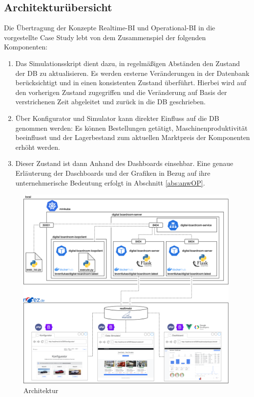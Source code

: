 \subsection{Architekturübersicht}
Die Übertragung der Konzepte Realtime-\ac{BI} und Operational-\ac{BI} in die vorgestellte Case Study lebt von dem Zusammenspiel der folgenden Komponenten: 
\begin{enumerate}
    \item Das Simulationsskript dient dazu, in regelmäßigen Abständen den Zustand der \ac{DB} zu aktualisieren. Es werden ersterne Veränderungen in der Datenbank berücksichtigt und in einen konsistenten Zustand überführt. Hierbei wird auf den vorherigen Zustand zugegriffen und die Veränderung auf Basis der verstrichenen Zeit abgeleitet und zurück in die \ac{DB} geschrieben.
    \item Über Konfigurator und Simulator kann direkter Einfluss auf die \ac{DB} genommen werden: Es können Bestellungen getätigt, Maschinenproduktivität beeinflusst und der Lagerbestand zum aktuellen Marktpreis der Komponenten erhöht werden.
    \item Dieser Zustand ist dann Anhand des Dashboards einsehbar. Eine genaue Erläuterung der Daschboards und der Grafiken in Bezug auf ihre unternehmerische Bedeutung erfolgt in Abschnitt \ref{abs:anwOP}.
\end{enumerate}
\begin{figure}[h]
    \centering
    \includegraphics[width=0.99\textwidth]{ausarbeitung-latex/img/Architektur-Vertikal.png}
    \caption{Architektur}
    \label{fig:arch}
\end{figure}
